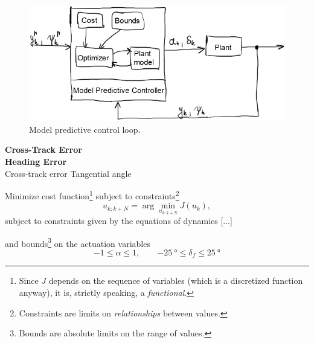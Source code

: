 \documentclass[a4paper]{article}
\begin{document}
\begin{figure}
	\centering
	\includegraphics[width=\columnwidth]{./img/mpc_control_loop.png}
	\caption{Model predictive control loop.}
\end{figure}



\textbf{Cross-Track Error} \\

\textbf{Heading Error} \\


Cross-track error
Tangential angle



Minimize cost function\footnote{Since \( J \) depends on the sequence of variables (which is a discretized function anyway), it is, strictly speaking, a \emph{functional}.} subject to constraints\footnote{Constraints are limits on \emph{relationships} between values.}
\begin{equation}\label{key}
	u_{k:k+N} = \arg\min_{u_{k:k+N}} J(u_k),
\end{equation}
subject to constraints given by the equations of dynamics [...]


and bounds\footnote{Bounds are absolute limits on the range of values.} on the actuation variables
\begin{equation}\label{eq:mpc_actuation_bounds}
	-1 \leq \alpha \leq 1 ,\qquad \SI{-25}{\degree} \leq \delta_f \leq \SI{25}{\degree}
\end{equation}





\end{document}
